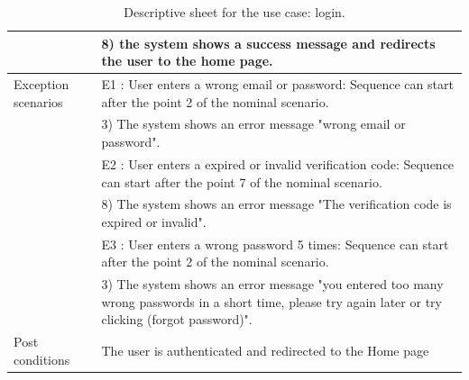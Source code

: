 \documentclass[]{uc2pfecaneva}
\begin{document}
\begin{table}
\begin{tabularx}{\textwidth}{|l|X|}
            & \hspace{4mm}8) the system shows a success message and redirects the user to the home page.                                                                         \\ \hline
            Exception scenarios
            & E1 : User enters a wrong email or password: Sequence can start after the point 2 of the nominal scenario.                                                            \\
            & \hspace{4mm}3) The system shows an error message "wrong email or password".                                                                                        \\
            & E2 : User enters a expired or invalid verification code: Sequence can start after the point 7 of the nominal scenario.                                               \\
            & \hspace{4mm}8) The system shows an error message "The verification code is expired or invalid".                                                                    \\
            & E3 : User enters a wrong password 5 times: Sequence can start after the point 2 of the nominal scenario.                                                             \\
            & \hspace{4mm}3) The system shows an error message "you entered too many wrong passwords in a short time, please try again later or try clicking (forgot password)". \\
            Post conditions
            & The user is authenticated and redirected to the Home page                                                                                                            \\ \hline
        \end{tabularx}
        \caption{Descriptive sheet for the use case: login.}
        \label{table:1}
    \end{table}
    \clearpage
\end{document}
